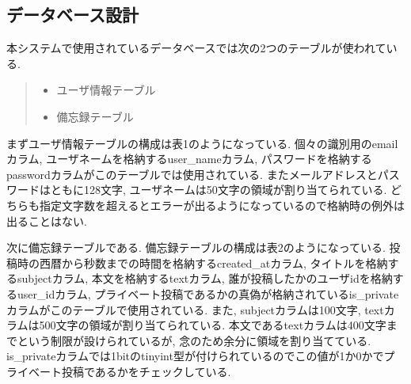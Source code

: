 \documentclass[submit,techrep]{ipsj}
\begin{document}
\subsection{データベース設計}
本システムで使用されているデータベースでは次の2つのテーブルが使われている. 
\begin{quote}
 \begin{itemize}
  \item ユーザ情報テーブル
  \item 備忘録テーブル
 \end{itemize}
\end{quote}

まずユーザ情報テーブルの構成は表1のようになっている. 個々の識別用のemailカラム, ユーザネームを格納するuser\_nameカラム, パスワードを格納するpasswordカラムがこのテーブルでは使用されている. 
またメールアドレスとパスワードはともに128文字, ユーザネームは50文字の領域が割り当てられている. どちらも指定文字数を超えるとエラーが出るようになっているので格納時の例外は出ることはない. 

\begin{table}[htb]
\centering
  \caption{ユーザ情報テーブル構成}
\end{table}

次に備忘録テーブルである. 備忘録テーブルの構成は表2のようになっている. 投稿時の西暦から秒数までの時間を格納するcreated\_atカラム, タイトルを格納するsubjectカラム, 本文を格納するtextカラム, 誰が投稿したかのユーザidを格納するuser\_idカラム, プライベート投稿であるかの真偽が格納されているis\_privateカラムがこのテーブルで使用されている. 
また, subjectカラムは100文字, textカラムは500文字の領域が割り当てられている. 本文であるtextカラムは400文字までという制限が設けられているが, 念のため余分に領域を割り当てている. 
is\_privateカラムでは1bitのtinyint型が付けられているのでこの値が1か0かでプライベート投稿であるかをチェックしている. 
\end{document}

